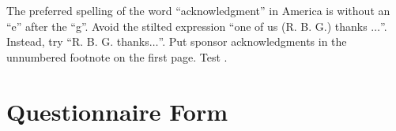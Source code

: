 \documentclass[conference]{IEEEtran}
\begin{document}
The preferred spelling of the word ``acknowledgment'' in America is without 
an ``e'' after the ``g''. Avoid the stilted expression ``one of us (R. B. 
G.) thanks $\ldots$''. Instead, try ``R. B. G. thanks$\ldots$''. Put sponsor 
acknowledgments in the unnumbered footnote on the first page. Test \cite{paige2009model}.





\appendices
\section{Questionnaire Form}
\label{app:questionnaire_form}
\end{document}
